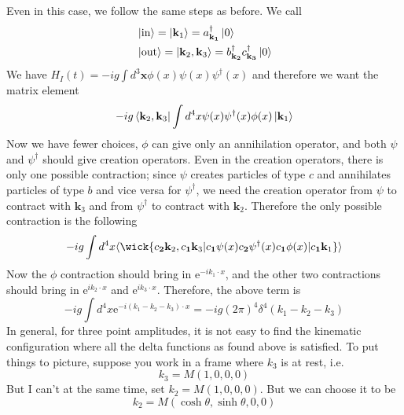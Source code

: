 \documentclass[11pt, notitlepage]{report}
\newcommand{\e}{\mathrm{e}}
\newcommand{\adag}[1]{a^\dagger_\mathbf{#1}}
\newcommand{\bdag}[1]{b^\dagger_\mathbf{#1}}
\renewcommand{\c}[1]{c_\mathbf{#1}}
\newcommand{\cdag}[1]{c^\dagger_\mathbf{#1}}
\numberwithin{equation}{section}
\begin{document}
    Even in this case, we follow the same steps as before. We call
    \begin{align*}
        &\ket{\text{in}} = \ket{\textbf{k}_1} = \adag{k_1}\ket{0}\\
        &\ket{\text{out}} = \ket{\textbf{k}_2, \textbf{k}_3} = \bdag{k_2}\cdag{k_3}\ket{0}
    \end{align*} 
    We have \(H_I(t) = -ig\int d^3\textbf{x} \phi(x) \psi(x) \psi^\dagger(x)\) and therefore we want the matrix element 
    \begin{equation*}
        -ig \bra{\textbf{k}_2, \textbf{k}_3} \int d^4x  \psi(x) \psi^\dagger(x) \phi(x) \ket{\textbf{k}_1} 
    \end{equation*}
    Now we have fewer choices, \(\phi\) can give only an annihilation operator, and both \(\psi\) and \(\psi^\dagger\) should give creation operators. Even in the creation operators, there is only one possible contraction; since \(\psi\) creates particles of type \(c\) and annihilates particles of type \(b\) and vice versa for \(\psi^\dagger\), we need the creation operator from \(\psi\) to contract with \(\textbf{k}_3\) and from \(\psi^\dagger\) to contract with \(\textbf{k}_2\). Therefore the only possible contraction is the following 
    \begin{equation*}
        -ig \int d^4x \langle \wick{\c2{\mathbf{k}_2},\c1{\mathbf{k}_3}| \c1 \psi(x) \c2 \psi^\dagger(x) \c1 \phi(x) | \c1{\mathbf{k}_1}}\rangle 
    \end{equation*}
    Now the \(\phi\) contraction should bring in \(\e^{-ik_1\cdot x}\), and the other two contractions should bring in \(\e^{ik_2\cdot x}\) and \(\e^{ik_3\cdot x}\). Therefore, the above term is 
    \begin{equation*}
        -ig \int d^4 x \e^{-i(k_1 - k_2 - k_3)\cdot x} = -ig(2\pi)^4 \delta^4(k_1 - k_2 - k_3)
    \end{equation*}
    In general, for three point amplitudes, it is not easy to find the kinematic configuration where all the delta functions as found above is satisfied. To put things to picture, suppose you work in a frame where \(k_3\) is at rest, i.e. 
    \begin{equation*}
        k_3 = M(1,0,0,0)
    \end{equation*}
    But I can't at the same time, set \(k_2 = M(1,0,0,0)\). But we can choose it to be 
    \begin{equation*}
        k_2 = M(\cosh\theta, \sinh\theta, 0, 0)
    \end{equation*} 
\end{document}
